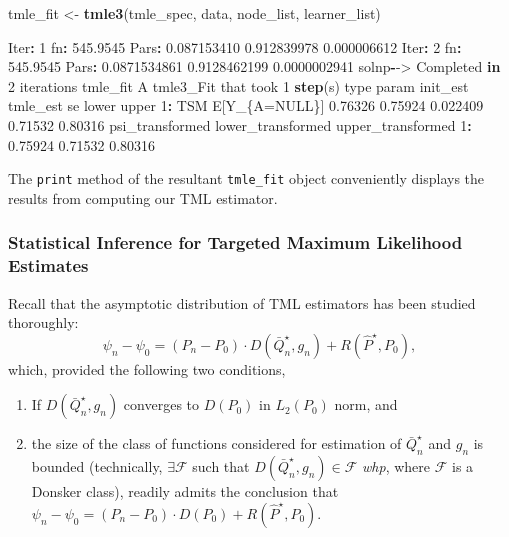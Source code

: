 \documentclass[12pt, krantz2,]{krantz}
\newenvironment{Shaded}{\begin{snugshade}}{\end{snugshade}}
\newcommand{\ControlFlowTok}[1]{\textcolor[rgb]{0.27,0.27,0.27}{\textbf{#1}}}
\newcommand{\DecValTok}[1]{\textcolor[rgb]{0.06,0.06,0.06}{#1}}
\newcommand{\FloatTok}[1]{\textcolor[rgb]{0.06,0.06,0.06}{#1}}
\newcommand{\KeywordTok}[1]{\textcolor[rgb]{0.27,0.27,0.27}{\textbf{#1}}}
\newcommand{\NormalTok}[1]{#1}
\newcommand{\OperatorTok}[1]{\textcolor[rgb]{0.43,0.43,0.43}{\textbf{#1}}}
\newcommand{\OtherTok}[1]{\textcolor[rgb]{0.37,0.37,0.37}{#1}}
\newcommand{\StringTok}[1]{\textcolor[rgb]{0.5,0.5,0.5}{#1}}
\providecommand{\tightlist}{%
  \setlength{\itemsep}{0pt}\setlength{\parskip}{0pt}}
\theoremstyle{definition}
\theoremstyle{definition}
\theoremstyle{definition}
\newcommand{\1}{\mathbbm{1}}
\begin{document}
\begin{Shaded}
\begin{Highlighting}[]
\NormalTok{tmle_fit <-}\StringTok{ }\KeywordTok{tmle3}\NormalTok{(tmle_spec, data, node_list, learner_list)}

\NormalTok{Iter}\OperatorTok{:}\StringTok{ }\DecValTok{1}\NormalTok{ fn}\OperatorTok{:}\StringTok{ }\FloatTok{545.9545}\NormalTok{     Pars}\OperatorTok{:}\StringTok{  }\FloatTok{0.087153410} \FloatTok{0.912839978} \FloatTok{0.000006612}
\NormalTok{Iter}\OperatorTok{:}\StringTok{ }\DecValTok{2}\NormalTok{ fn}\OperatorTok{:}\StringTok{ }\FloatTok{545.9545}\NormalTok{     Pars}\OperatorTok{:}\StringTok{  }\FloatTok{0.0871534861} \FloatTok{0.9128462199} \FloatTok{0.0000002941}
\NormalTok{solnp}\OperatorTok{-}\NormalTok{->}\StringTok{ }\NormalTok{Completed }\ControlFlowTok{in} \DecValTok{2}\NormalTok{ iterations}
\NormalTok{tmle_fit}
\NormalTok{A tmle3_Fit that took }\DecValTok{1} \KeywordTok{step}\NormalTok{(s)}
\NormalTok{   type         param init_est tmle_est       se   lower   upper}
\DecValTok{1}\OperatorTok{:}\StringTok{  }\NormalTok{TSM E[Y_\{A=}\OtherTok{NULL}\NormalTok{\}]  }\FloatTok{0.76326}  \FloatTok{0.75924} \FloatTok{0.022409} \FloatTok{0.71532} \FloatTok{0.80316}
\NormalTok{   psi_transformed lower_transformed upper_transformed}
\DecValTok{1}\OperatorTok{:}\StringTok{         }\FloatTok{0.75924}           \FloatTok{0.71532}           \FloatTok{0.80316}
\end{Highlighting}
\end{Shaded}

The \texttt{print} method of the resultant \texttt{tmle\_fit} object conveniently displays the
results from computing our TML estimator.

\hypertarget{statistical-inference-for-targeted-maximum-likelihood-estimates}{%
\subsubsection{Statistical Inference for Targeted Maximum Likelihood Estimates}\label{statistical-inference-for-targeted-maximum-likelihood-estimates}}

Recall that the asymptotic distribution of TML estimators has been studied
thoroughly:
\[\psi_n - \psi_0 = (P_n - P_0) \cdot D(\bar{Q}_n^{\star}, g_n) +
R(\hat{P}^{\star}, P_0),\]
which, provided the following two conditions,

\begin{enumerate}
\def\labelenumi{\arabic{enumi}.}
\tightlist
\item
  If \(D(\bar{Q}_n^{\star}, g_n)\) converges to \(D(P_0)\) in \(L_2(P_0)\) norm, and
\item
  the size of the class of functions considered for estimation of
  \(\bar{Q}_n^{\star}\) and \(g_n\) is bounded (technically, \(\exists \mathcal{F}\)
  such that \(D(\bar{Q}_n^{\star}, g_n) \in \mathcal{F}\) \emph{whp}, where
  \(\mathcal{F}\) is a Donsker class),
  readily admits the conclusion that
  \(\psi_n - \psi_0 = (P_n - P_0) \cdot D(P_0) + R(\hat{P}^{\star}, P_0)\).
\end{enumerate}
\end{document}
